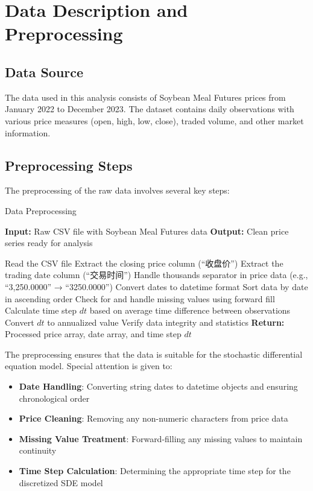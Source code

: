 \documentclass[12pt,a4paper]{article}
\begin{document}
\section{Data Description and Preprocessing}

\subsection{Data Source}

The data used in this analysis consists of Soybean Meal Futures prices from January 2022 to December 2023. The dataset contains daily observations with various price measures (open, high, low, close), traded volume, and other market information.

\subsection{Preprocessing Steps}

The preprocessing of the raw data involves several key steps:

\begin{algorithm}
\caption{Data Preprocessing}
\begin{algorithmic}[1]
\State \textbf{Input:} Raw CSV file with Soybean Meal Futures data
\State \textbf{Output:} Clean price series ready for analysis

\State Read the CSV file
\State Extract the closing price column (``收盘价'')
\State Extract the trading date column (``交易时间'')
\State Handle thousands separator in price data (e.g., ``3,250.0000'' → ``3250.0000'')
\State Convert dates to datetime format
\State Sort data by date in ascending order
\State Check for and handle missing values using forward fill
\State Calculate time step $dt$ based on average time difference between observations
\State Convert $dt$ to annualized value
\State Verify data integrity and statistics
\State \textbf{Return:} Processed price array, date array, and time step $dt$
\end{algorithmic}
\end{algorithm}

The preprocessing ensures that the data is suitable for the stochastic differential equation model. Special attention is given to:

\begin{itemize}
    \item \textbf{Date Handling}: Converting string dates to datetime objects and ensuring chronological order
    \item \textbf{Price Cleaning}: Removing any non-numeric characters from price data
    \item \textbf{Missing Value Treatment}: Forward-filling any missing values to maintain continuity
    \item \textbf{Time Step Calculation}: Determining the appropriate time step for the discretized SDE model
\end{itemize}
\end{document}
